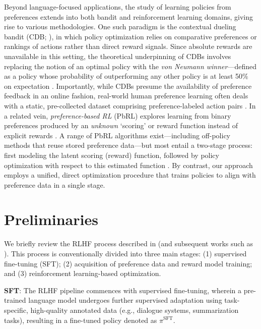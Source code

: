Beyond language-focused applications, the study of learning policies from preferences extends into both bandit and reinforcement learning domains, giving rise to various methodologies. One such paradigm is the contextual dueling bandit (CDB; \cite{yue2012karmed,dudik2015contextual}), in which policy optimization relies on comparative preferences or rankings of actions rather than direct reward signals. Since absolute rewards are unavailable in this setting, the theoretical underpinning of CDBs involves replacing the notion of an optimal policy with the \textit{von Neumann winner}—defined as a policy whose probability of outperforming any other policy is at least 50\% on expectation \citep{dudik2015contextual}. Importantly, while CDBs presume the availability of preference feedback in an online fashion, real-world human preference learning often deals with a static, pre-collected dataset comprising preference-labeled action pairs \citep{yan2022human}. In a related vein, \textit{preference-based RL} (PbRL) explores learning from binary preferences produced by an \textit{unknown} `scoring' or reward function instead of explicit rewards \citep{BusaFekete2014,ruiz2023dueling}. A range of PbRL algorithms exist—including off-policy methods that reuse stored preference data—but most entail a two-stage process: first modeling the latent scoring (reward) function, followed by policy optimization with respect to this estimated function \citep{jain2013learning,BusaFekete2014,christiano2017deep,sadigh2017active,kupcsik2018learning}. By contrast, our approach employs a unified, direct optimization procedure that trains policies to align with preference data in a single stage.

\section{Preliminaries}\label{section:prelims}

We briefly review the RLHF process described in \citeauthor{ziegler2020finetuning} (and subsequent works such as \citep{stiennon2022learning, bai2022training, ouyang2022training}). This process is conventionally divided into three main stages: (1) supervised fine-tuning (SFT); (2) acquisition of preference data and reward model training; and (3) reinforcement learning-based optimization.

\textbf{SFT}: The RLHF pipeline commences with supervised fine-tuning, wherein a pre-trained language model undergoes further supervised adaptation using task-specific, high-quality annotated data (e.g., dialogue systems, summarization tasks), resulting in a fine-tuned policy denoted as $\pi^\text{SFT}$.

